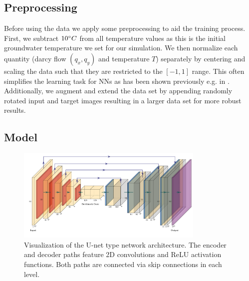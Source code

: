 \documentclass{article} %
\begin{document}

\subsection*{Preprocessing}
Before using the data we apply some preprocessing to aid the training process.
First, we subtract $10 \degree C$ from all temperature values as this is the initial groundwater temperature we set for our simulation.
We then normalize each quantity (darcy flow $(q_x, q_y)$ and temperature $T$) separately by centering and scaling the data such that they are restricted to the $[-1, 1]$ range.
This often simplifies the learning task for NNs as has been shown previously e.g. in \citep{LeCun2012,Wiesler2011}.
Additionally, we augment and extend the data set by appending randomly rotated input and target images resulting in a larger data set for more robust results.


\subsection*{Model}
\begin{figure}[!htb]
   \centering
   \includegraphics[width=0.8\textwidth]{img/arch.pdf}
   \caption{Visualization of the U-net type network architecture. The encoder and decoder paths feature 2D convolutions and ReLU activation functions. Both paths are connected via skip connections in each level.}
   \label{fig:arch}
\end{figure}
\end{document}
